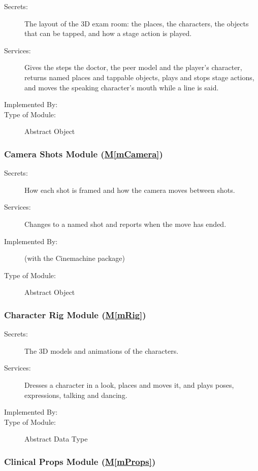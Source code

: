 \documentclass[12pt, titlepage]{article}
\newcommand{\mref}[1]{\hyperref[#1]{M\ref*{#1}}}
\begin{document}
\begin{description}
\item[Secrets:] The layout of the 3D exam room: the places, the characters, the
  objects that can be tapped, and how a stage action is played.
\item[Services:] Gives the steps the doctor, the peer model and the player's
  character, returns named places and tappable objects, plays and stops stage
  actions, and moves the speaking character's mouth while a line is said.
\item[Implemented By:] \progname{}
\item[Type of Module:] Abstract Object
\end{description}

\subsubsection{Camera Shots Module (\mref{mCamera})}

\begin{description}
\item[Secrets:] How each shot is framed and how the camera moves between shots.
\item[Services:] Changes to a named shot and reports when the move has ended.
\item[Implemented By:] \progname{} (with the Cinemachine package)
\item[Type of Module:] Abstract Object
\end{description}

\subsubsection{Character Rig Module (\mref{mRig})}

\begin{description}
\item[Secrets:] The 3D models and animations of the characters.
\item[Services:] Dresses a character in a look, places and moves it, and plays
  poses, expressions, talking and dancing.
\item[Implemented By:] \progname{}
\item[Type of Module:] Abstract Data Type
\end{description}

\subsubsection{Clinical Props Module (\mref{mProps})}
\end{document}
